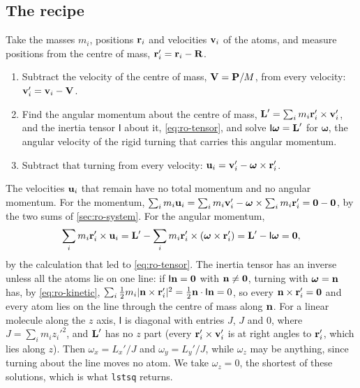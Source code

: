 \subsection*{The recipe}

Take the masses $m_i$, positions $\bm{\mathrm{r}}_i$ and velocities $\bm{\mathrm{v}}_i$ of
the atoms, and measure positions from the centre of mass, $\bm{\mathrm{r}}_i' =
\bm{\mathrm{r}}_i - \bm{\mathrm{R}}$.
\begin{enumerate}
\item Subtract the velocity of the centre of mass, $\bm{\mathrm{V}} = \bm{\mathrm{P}}/M$,
   from every velocity: $\bm{\mathrm{v}}_i' = \bm{\mathrm{v}}_i - \bm{\mathrm{V}}$.
\item Find the angular momentum about the centre of mass, $\bm{\mathrm{L}}' =
   \sum_i m_i\bm{\mathrm{r}}_i'\times\bm{\mathrm{v}}_i'$, and the inertia tensor
   $\mathsf{I}$ about it, \cref{eq:ro-tensor}, and solve
   $\mathsf{I}\boldsymbol{\omega} = \bm{\mathrm{L}}'$ for $\boldsymbol{\omega}$, the
   angular velocity of the rigid turning that carries this angular
   momentum.
\item Subtract that turning from every velocity: $\bm{\mathrm{u}}_i = \bm{\mathrm{v}}_i' -
   \boldsymbol{\omega}\times\bm{\mathrm{r}}_i'$.
\end{enumerate}
The velocities $\bm{\mathrm{u}}_i$ that remain have no total momentum and no
angular momentum. For the momentum, $\sum_i m_i\bm{\mathrm{u}}_i = \sum_i m_i
\bm{\mathrm{v}}_i' - \boldsymbol{\omega}\times\sum_i m_i\bm{\mathrm{r}}_i' = \bm{\mathrm{0}} - \bm{\mathrm{0}}$,
by the two sums of \cref{sec:ro-system}. For the angular momentum,
\begin{equation*}
   \sum_i m_i\bm{\mathrm{r}}_i'\times\bm{\mathrm{u}}_i
   = \bm{\mathrm{L}}' - \sum_i m_i\bm{\mathrm{r}}_i'\times(\boldsymbol{\omega}\times
   \bm{\mathrm{r}}_i') = \bm{\mathrm{L}}' - \mathsf{I}\boldsymbol{\omega} = \bm{\mathrm{0}} ,
\end{equation*}
by the calculation that led to \cref{eq:ro-tensor}. The inertia tensor has an inverse unless all the atoms lie on one line:
if $\mathsf{I}\bm{\mathrm{n}} = \bm{\mathrm{0}}$ with $\bm{\mathrm{n}} \neq \bm{\mathrm{0}}$, turning with
$\boldsymbol{\omega} = \bm{\mathrm{n}}$ has, by \cref{eq:ro-kinetic},
$\sum_i\frac12 m_i\lvert\bm{\mathrm{n}}\times\bm{\mathrm{r}}_i'\rvert^2 =
\frac12\bm{\mathrm{n}}\cdot\mathsf{I}\bm{\mathrm{n}} = 0$, so every $\bm{\mathrm{n}}\times\bm{\mathrm{r}}_i' =
\bm{\mathrm{0}}$ and every atom lies on the line through the centre of mass along
$\bm{\mathrm{n}}$. For a linear molecule along the $z$ axis, $\mathsf{I}$ is
diagonal with entries $J$, $J$ and 0, where $J = \sum_i m_iz_i'^2$, and
$\bm{\mathrm{L}}'$ has no $z$ part (every $\bm{\mathrm{r}}_i'\times\bm{\mathrm{v}}_i'$ is at right
angles to $\bm{\mathrm{r}}_i'$, which lies along $z$). Then $\omega_x = L_x'/J$ and
$\omega_y = L_y'/J$, while $\omega_z$ may be anything, since turning about
the line moves no atom. We take $\omega_z = 0$, the shortest of these
solutions, which is what \texttt{lstsq} returns.

